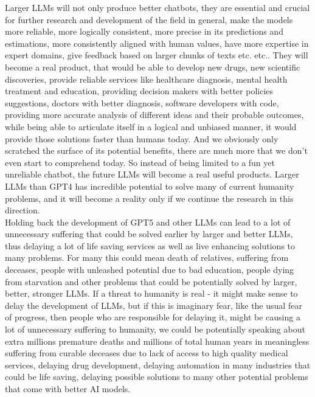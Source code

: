 \documentclass{article}
\begin{document}
Larger LLMs will not only produce better chatbots, they are essential and crucial for further research and development of the field in general, make the models more reliable, more logically consistent, more precise in its predictions and estimations, more consistently aligned with human values, have more expertise in expert domains, give feedback based on larger chunks of texts etc. etc.\cite{toews2023next}. They will become a real product, that would be able to develop new drugs, new scientific discoveries, provide reliable services like healthcare diagnosis, mental health treatment and education, providing decision makers with better policies suggestions, doctors with better diagnosis, software developers with code, providing more accurate analysis of different ideas and their probable outcomes, while being able to articulate itself in a logical and unbiased manner, it would provide those solutions faster than humans today. And we obviously only scratched the surface of its potential benefits, there are much more that we don't even start to comprehend today. So instead of being limited to a fun yet unreliable chatbot, the future LLMs will become a real useful products. Larger LLMs than GPT4 has incredible potential to solve many of current humanity problems, and it will become a reality only if we continue the research in this direction. \\

Holding back the development of GPT5 and other LLMs can lead to a lot of unnecessary suffering that could be solved earlier by larger and better LLMs, thus delaying a lot of life saving services as well as live enhancing solutions to many problems. For many this could mean death of relatives, suffering from deceases, people with unleashed potential due to bad education, people dying from starvation and other problems that could be potentially solved by larger, better, stronger LLMs. If a threat to humanity is real - it might make sense to delay the development of LLMs, but if this is imaginary fear, like the usual fear of progress, then people who are responsible for delaying it, might be causing a lot of unnecessary suffering to humanity, we could be potentially speaking about extra millions premature deaths and millions of total human years in meaningless suffering from curable deceases due to lack of access to high quality medical services, delaying drug development, delaying automation in many industries that could be life saving, delaying possible solutions to many other potential problems that come with better AI models. \\
\end{document}

